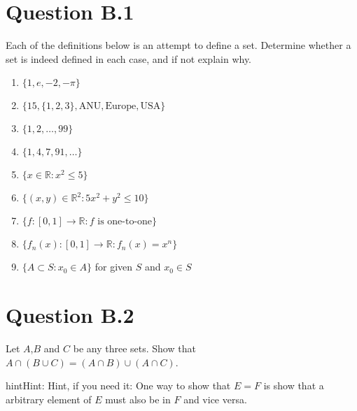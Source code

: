 \documentclass[letterpaper,10pt,english]{jupyterBook}
\begin{document}
\section{Question B.1}
\label{\detokenize{03.exercises:question-b-1}}
\sphinxAtStartPar
Each of the definitions below is an attempt to define a set. Determine whether a set is indeed defined in each case, and if not explain why.
\begin{enumerate}
%
\item {} 
\sphinxAtStartPar
\(\{1,e,-2,-\pi\}\)

\item {} 
\sphinxAtStartPar
\(\{15,\{1,2,3\},\text{ANU},\text{Europe},\text{USA}\}\)

\item {} 
\sphinxAtStartPar
\(\{1,2,\dots,99 \}\)

\item {} 
\sphinxAtStartPar
\(\{1,4,7,91, \dots \}\)

\item {} 
\sphinxAtStartPar
\(\{x \in \mathbb{R} \colon x^2 \le 5\}\)

\item {} 
\sphinxAtStartPar
\(\{(x,y) \in \mathbb{R}^2 \colon 5x^2 + y^2 \le 10\}\)

\item {} 
\sphinxAtStartPar
\(\{f \colon [0,1] \rightarrow \mathbb{R} \colon f \text{ is one-to-one} \}\)

\item {} 
\sphinxAtStartPar
\(\{ f_n(x) \colon [0,1] \rightarrow \mathbb{R} \colon f_n(x) = x^n \}\)

\item {} 
\sphinxAtStartPar
\(\{A \subset S : x_0 \in A \}\) for given \(S\) and \(x_0 \in S\)

\end{enumerate}


\section{Question B.2}
\label{\detokenize{03.exercises:question-b-2}}
\sphinxAtStartPar
Let \(A\),\(B\) and \(C\) be any three sets.
Show that \(A \cap (B \cup C) = (A\cap B) \cup (A \cap C)\).

\begin{sphinxadmonition}{hint}{Hint:}
\sphinxAtStartPar
Hint, if you need it: One way to show that \(E=F\) is show that a arbitrary element of \(E\) must also be in \(F\) and vice versa.
\end{sphinxadmonition}
\end{document}
